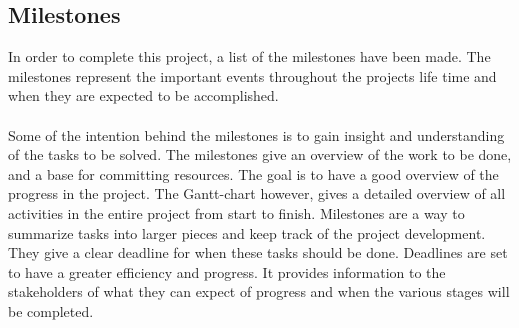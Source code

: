 \subsection{Milestones}
In order to complete this project, a list of the milestones have been made. The milestones represent the important events throughout the projects life time and when they are expected to be accomplished. 
\\\\
Some of the intention behind the milestones is to gain insight and understanding of the tasks to be solved. The milestones give an overview of the work to be done, and a base for committing resources. The goal is to have a good overview of the progress in the project. The Gantt-chart however, gives a detailed overview of all activities in the entire project from start to finish. Milestones are a way to summarize tasks into larger pieces and keep track of the project development. They give a clear deadline for when these tasks should be done. Deadlines are set to have a greater efficiency and progress. It provides information to the stakeholders of what they can expect of progress and when the various stages will be completed.\\
